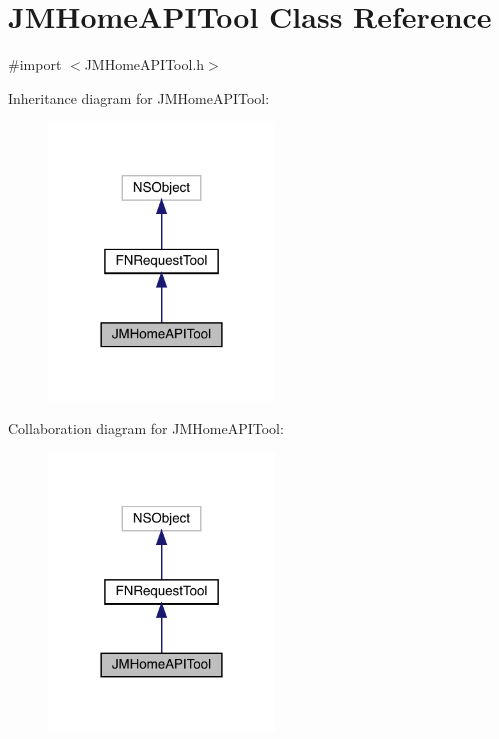 \hypertarget{interface_j_m_home_a_p_i_tool}{}\section{J\+M\+Home\+A\+P\+I\+Tool Class Reference}
\label{interface_j_m_home_a_p_i_tool}


{\ttfamily \#import $<$J\+M\+Home\+A\+P\+I\+Tool.\+h$>$}



Inheritance diagram for J\+M\+Home\+A\+P\+I\+Tool\+:\nopagebreak
\begin{figure}[H]
\begin{center}
\leavevmode
\includegraphics[width=170pt]{interface_j_m_home_a_p_i_tool__inherit__graph}
\end{center}
\end{figure}


Collaboration diagram for J\+M\+Home\+A\+P\+I\+Tool\+:\nopagebreak
\begin{figure}[H]
\begin{center}
\leavevmode
\includegraphics[width=170pt]{interface_j_m_home_a_p_i_tool__coll__graph}
\end{center}
\end{figure}
